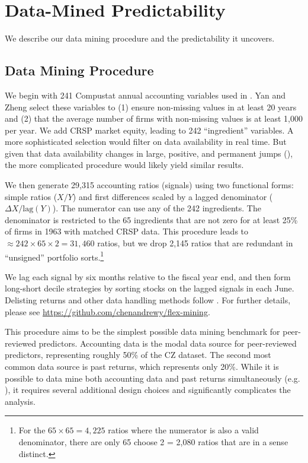 \section{Data-Mined Predictability}\label{sec:dm}
We describe our data mining procedure and the predictability it uncovers.

\subsection{Data Mining Procedure}\label{sec:dm-data}

We begin with 241 Compustat annual accounting variables used in \citet{yan2017fundamental}. Yan and Zheng select these variables to (1) ensure non-missing values in at least 20 years and (2) that the average number of firms with non-missing values is at least 1,000 per year. We add CRSP market equity, leading to 242 ``ingredient'' variables. A more sophisticated selection would filter on data availability in real time. But given that data availability changes in large, positive, and permanent jumps (\citealt{easterwood2024do}), the more complicated procedure would likely yield similar results.

We then generate 29,315 accounting ratios (signals) using two functional forms: simple ratios ($X/Y$) and first differences scaled by a lagged denominator ($\Delta X / \text{lag}(Y)$). The numerator can use any of the 242 ingredients. The denominator is restricted to the 65 ingredients that are not zero for at least 25\% of firms in 1963 with matched CRSP data. This procedure leads to $\approx 242 \times 65 \times 2 = 31,460$ ratios, but we drop 2,145 ratios that are redundant in ``unsigned'' portfolio sorts.\footnote{For the $65\times65 = 4,225$ ratios where the numerator is also a valid denominator, there are only 65 choose 2 = 2,080 ratios that are in a sense distinct.}  

We lag each signal by six months relative to the fiscal year end, and then form long-short decile strategies by sorting stocks on the lagged signals in each June.  Delisting returns and other data handling methods follow \citet{ChenZimmermann2021}.  For further details, please see \url{https://github.com/chenandrewy/flex-mining}.

This procedure aims to be the simplest possible data mining benchmark for peer-reviewed predictors. Accounting data is the modal data source for peer-reviewed predictors, representing roughly 50\% of the CZ dataset. The second most common data source is past returns, which represents only 20\%.  While it is possible to data mine both accounting data and past returns simultaneously (e.g. \citealt{chen2023high}), it requires several additional design choices and significantly complicates the analysis. 

